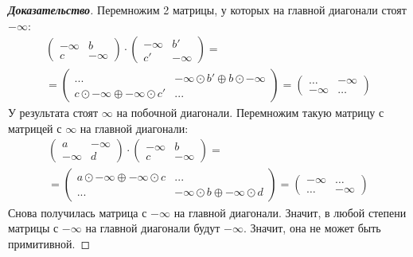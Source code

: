 \documentclass[12pt]{article}
\begin{document}
\begin{proof}[\textbf{Доказательство}]
Перемножим 2 матрицы, у которых на главной диагонали стоят $-\infty$:
\begin{multline*}
\begin{pmatrix}
-\infty & b \\
c & -\infty
\end{pmatrix} \cdot \begin{pmatrix}
-\infty & b' \\
c' & -\infty
\end{pmatrix} = \\ = \begin{pmatrix}
... & 
-\infty \odot b' \oplus b \odot -\infty \\
c \odot -\infty \oplus -\infty \odot c' &
...
\end{pmatrix} = \begin{pmatrix}
\dots & -\infty \\
-\infty & \dots
\end{pmatrix}
\end{multline*}
У результата стоят $\infty$ на побочной диагонали. Перемножим такую матрицу с матрицей с $\infty$ на главной диагонали:
\begin{multline*}
\begin{pmatrix}
a & -\infty \\
-\infty & d
\end{pmatrix} \cdot \begin{pmatrix}
-\infty & b \\
c & -\infty
\end{pmatrix} = \\ = \begin{pmatrix}
a \odot -\infty \oplus -\infty \odot c & 
... \\
... & 
-\infty \odot b \oplus -\infty \odot d
\end{pmatrix} = \begin{pmatrix}
-\infty & \dots \\
\dots & -\infty
\end{pmatrix}
\end{multline*}
Снова получилась матрица с $-\infty$ на главной диагонали. Значит, в любой степени матрицы с $-\infty$ на главной диагонали будут $-\infty$. Значит, она не может быть примитивной.


\end{proof}
\end{document}

